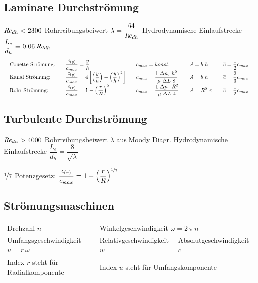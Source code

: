 \subsection{Laminare Durchströmung}
	$ \operatorname{\mathit{R\kern-.10em e}}_{dh} < 2300 $ \quad	Rohrreibungsbeiwert $ \lambda = \dfrac{64}{\operatorname{\mathit{R\kern-.10em e}}_{dh}} $ \qquad	Hydrodynamische Einlaufstrecke $ \dfrac{L_e}{d_h} = \num{0,06} \operatorname{\mathit{R\kern-.10em e}}_{dh}  $
	\setlength{\abovedisplayskip}{5pt}
	\[ \arraycolsep=1em
	\begin{array}{lllll}
		\text{Couette Strömung:} & \dfrac{c_{(y)}}{c_{max}} = \dfrac{y}{h}                                                            & c_{max} = konst.                                       & A = b\ h     & \overline{c} = \dfrac{1}{2} c_{max} \\
		\text{Kanal Strömung:}   & \dfrac{c_{(y)}}{c_{max}} = 4 \left[\left(\dfrac{y}{h}\right) - \left(\dfrac{y}{h}\right)^2 \right] & c_{max} = \dfrac{1\ \Delta p_v\ h^2}{\mu\ \Delta L\ 8} & A = b\ h     & \overline{c} = \dfrac{2}{3} c_{max} \\
		\text{Rohr Strömung:}    & \dfrac{c_{(r)}}{c_{max}} = 1 - \left(\dfrac{r}{R}\right)^2                                         & c_{max} = \dfrac{1\ \Delta p_v\ R^2}{\mu\ \Delta L\ 4} & A = R^2\ \pi & \overline{c} = \dfrac{1}{2} c_{max}
	\end{array}
	\]
\subsection{Turbulente Durchströmung}
	$ \operatorname{\mathit{R\kern-.10em e}}_{dh} > 4000 $ \quad	Rohrreibungsbeiwert $ \lambda $ aus Moody Diagr. \qquad	Hydrodynamische Einlaufstrecke $ \dfrac{L_e}{d_h} = \dfrac{8}{\sqrt{\lambda}}  $

	$ \nicefrac{1}{7} $ Potenzgesetz: $ \dfrac{c_{(r)}}{c_{max}} = 1 - \left(\dfrac{r}{R}\right)^{\nicefrac{1}{7}} $

\subsection{Strömungsmaschinen}
%
	\begin{center}
		\setlength{\tabcolsep}{1.3em} %
		\begin{tabular}{lll}
			Drehzahl $ \dot{n} $                     & \multicolumn{2}{l}{Winkelgeschwindigkeit $ \omega = 2\ \pi\ \dot{n} $}                              \\
			Umfangsgeschwindigkeit $ u = r\ \omega $ & Relativgeschwindigkeit $ w $                       & Absolutgeschwindigkeit $ c $ \\
			Index $ r $ steht für Radialkomponente   & \multicolumn{2}{l}{Index $ u $ steht für Umfangskomponente}
		\end{tabular}
	\end{center}


